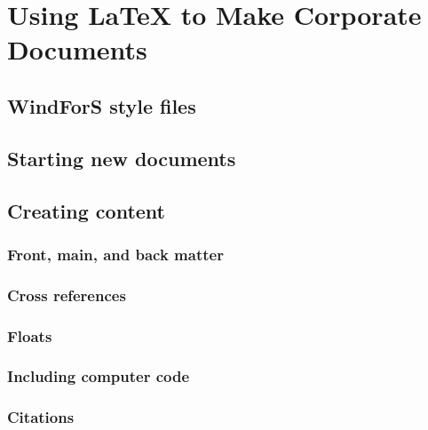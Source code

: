 \section{Using LaTeX to Make Corporate Documents }


\subsection{WindForS style files}\label{sec:Corporatecls}


\subsection{Starting new documents}\label{sec:NewDocs}


\subsection{Creating content}
\subsubsection{Front, main, and back matter}


\subsubsection{Cross references}


\subsubsection{Floats}


\subsubsection{Including computer code}\label{Sec:Codes}


\subsubsection{Citations}\label{Sec:Citations}


